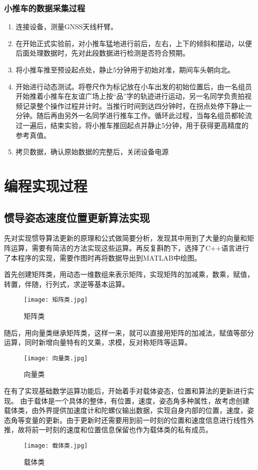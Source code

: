 \documentclass{ctexart}
\begin{document}
\subsubsection{小推车的数据采集过程}
\begin{enumerate}[(1)]
\item 连接设备，测量GNSS天线杆臂。
\item 在开始正式实验前，对小推车猛地进行前后，左右，上下的倾斜和摆动，以便后面处理数据时，先对此段数据进行检测是否符合预期。
\item 将小推车推至预设起点处，静止5分钟用于初始对准，期间车头朝向北。
\item 开始进行动态测试。将卷尺作为标记放在小车出发的初始位置后，由一名组员开始推着小推车在友谊广场上按“品”字的轨迹进行运动，另一名同学负责拍视频记录整个操作过程并计时。当推行时间到达四分钟时，在拐点处停下静止一分钟。随后再由另外一名同学进行推车工作。循环此过程，当每名组员都轮流过一遍后，结束实验，将小推车推回起点并静止5分钟，用于获得更高精度的参考真值。
\item 拷贝数据，确认原始数据的完整后，关闭设备电源
\end{enumerate}

\section{编程实现过程}
\subsection{惯导姿态速度位置更新算法实现}
先对实现惯导算法更新的原理和公式做简要分析，发现其中用到了大量的向量和矩阵运算，需要有简洁的方法实现这些运算。再反复斟酌下，选择了C++语言进行了本程序的实现，需要作图时再将数据导出到MATLAB中绘图。

首先创建矩阵类，用动态一维数组来表示矩阵，实现矩阵的加减乘，数乘，赋值，转置，伴随，行列式，求逆等基本运算。
\begin{figure}[H]
\texttt{[image: 矩阵类.jpg]}
\caption{矩阵类}
\end{figure}
随后，用向量类继承矩阵类，这样一来，就可以直接用矩阵的加减法，赋值等部分运算，同时新增向量特有的叉乘，求模，反对称矩阵等运算。
\begin{figure}[H]
\texttt{[image: 向量类.jpg]}
\caption{向量类}
\end{figure}

在有了实现基础数学运算功能后，开始着手对载体姿态，位置和算法的更新进行实现。
由于载体是一个具体的整体，有位置，速度，姿态角多种属性，故考虑创建载体类，由外界提供加速度计和陀螺仪输出数据，实现自身内部的位置，速度，姿态角等变量的更新。由于更新时还需要用到前一时刻的位置和速度信息进行线性外推，故将前一时刻的速度和位置信息保留也作为载体类的私有成员。
\begin{figure}[H]
\texttt{[image: 载体类.jpg]}
\caption{载体类}
\end{figure}
\end{document}
